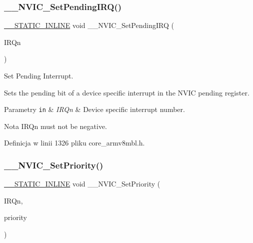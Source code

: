 \subsubsection{\texorpdfstring{\+\_\+\+\_\+\+N\+V\+I\+C\+\_\+\+Set\+Pending\+I\+R\+Q()}{\_\_NVIC\_SetPendingIRQ()}}
{\footnotesize\ttfamily \hyperlink{cmsis__iccarm_8h_aba87361bfad2ae52cfe2f40c1a1dbf9c}{\+\_\+\+\_\+\+S\+T\+A\+T\+I\+C\+\_\+\+I\+N\+L\+I\+NE} void \+\_\+\+\_\+\+N\+V\+I\+C\+\_\+\+Set\+Pending\+I\+RQ (\begin{DoxyParamCaption}\item[{\hyperlink{group___peripheral__interrupt__number__definition_ga7e1129cd8a196f4284d41db3e82ad5c8}{I\+R\+Qn\+\_\+\+Type}}]{I\+R\+Qn }\end{DoxyParamCaption})}



Set Pending Interrupt. 

Sets the pending bit of a device specific interrupt in the N\+V\+IC pending register. 
\begin{DoxyParams}[1]{Parametry}
\mbox{\tt in}  & {\em I\+R\+Qn} & Device specific interrupt number. \\
\hline
\end{DoxyParams}
\begin{DoxyNote}{Nota}
I\+R\+Qn must not be negative. 
\end{DoxyNote}


Definicja w linii 1326 pliku core\+\_\+armv8mbl.\+h.

\mbox{\label{group___c_m_s_i_s___core___n_v_i_c_functions_ga505338e23563a9c074910fb14e7d45fd}} 
\subsubsection{\texorpdfstring{\+\_\+\+\_\+\+N\+V\+I\+C\+\_\+\+Set\+Priority()}{\_\_NVIC\_SetPriority()}}
{\footnotesize\ttfamily \hyperlink{cmsis__iccarm_8h_aba87361bfad2ae52cfe2f40c1a1dbf9c}{\+\_\+\+\_\+\+S\+T\+A\+T\+I\+C\+\_\+\+I\+N\+L\+I\+NE} void \+\_\+\+\_\+\+N\+V\+I\+C\+\_\+\+Set\+Priority (\begin{DoxyParamCaption}\item[{\hyperlink{group___peripheral__interrupt__number__definition_ga7e1129cd8a196f4284d41db3e82ad5c8}{I\+R\+Qn\+\_\+\+Type}}]{I\+R\+Qn,  }\item[{uint32\+\_\+t}]{priority }\end{DoxyParamCaption})}



